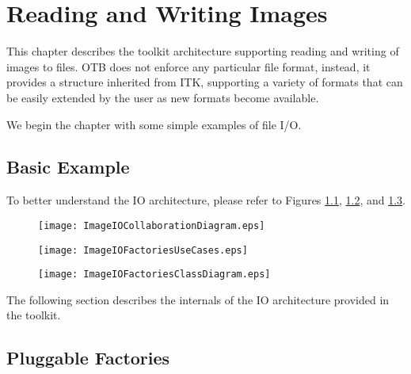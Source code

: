 \chapter{Reading and Writing Images}
\label{sec:IO}

This chapter describes the toolkit architecture supporting reading and
writing of images to files. OTB does not enforce any particular file
format, instead, it provides a structure inherited from ITK,
supporting a variety of formats that can be easily extended by the
user as new formats become available.

We begin the chapter with some simple examples of file I/O.

\section{Basic Example}
\label{sec:ImagReadWrite}


To better understand the IO architecture, please refer to Figures 
\ref{fig:ImageIOCollaborationDiagram}, 
\ref{fig:ImageIOFactoriesUseCases}, and
\ref{fig:ImageIOFactoriesClassDiagram}. 

\begin{figure}
\center
\texttt{[image: ImageIOCollaborationDiagram.eps]}
 \label{fig:ImageIOCollaborationDiagram}
\end{figure}

\begin{figure}
\center
\texttt{[image: ImageIOFactoriesUseCases.eps]}
\label{fig:ImageIOFactoriesUseCases}
\end{figure}

\begin{figure}
\center
\texttt{[image: ImageIOFactoriesClassDiagram.eps]}
\label{fig:ImageIOFactoriesClassDiagram}
\end{figure}


The following section describes the internals of the IO architecture provided
in the toolkit.

\section{Pluggable Factories}
\label{sec:ImageIOPluggableFactories}


